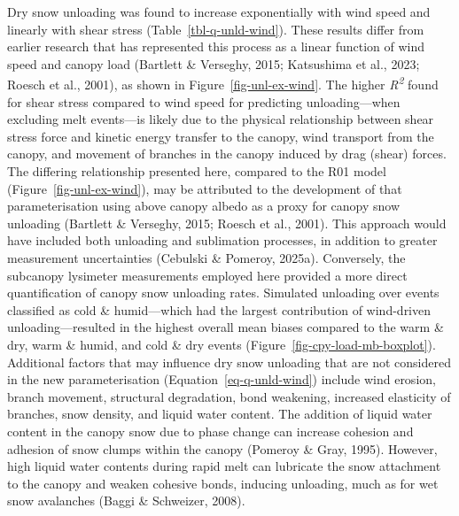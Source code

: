 \documentclass[
]{agujournal2019}
\begin{document}
Dry snow unloading was found to increase exponentially with wind speed
and linearly with shear stress (Table~\ref{tbl-q-unld-wind}). These
results differ from earlier research that has represented this process
as a linear function of wind speed and canopy load (Bartlett \&
Verseghy, 2015; Katsushima et al., 2023; Roesch et al., 2001), as shown
in Figure~\ref{fig-unl-ex-wind}. The higher \emph{R\textsuperscript{2}}
found for shear stress compared to wind speed for predicting
unloading---when excluding melt events---is likely due to the physical
relationship between shear stress force and kinetic energy transfer to
the canopy, wind transport from the canopy, and movement of branches in
the canopy induced by drag (shear) forces. The differing relationship
presented here, compared to the R01 model
(Figure~\ref{fig-unl-ex-wind}), may be attributed to the development of
that parameterisation using above canopy albedo as a proxy for canopy
snow unloading (Bartlett \& Verseghy, 2015; Roesch et al., 2001). This
approach would have included both unloading and sublimation processes,
in addition to greater measurement uncertainties (Cebulski \& Pomeroy,
2025a). Conversely, the subcanopy lysimeter measurements employed here
provided a more direct quantification of canopy snow unloading rates.
Simulated unloading over events classified as cold \& humid---which had
the largest contribution of wind-driven unloading---resulted in the
highest overall mean biases compared to the warm \& dry, warm \& humid,
and cold \& dry events (Figure~\ref{fig-cpy-load-mb-boxplot}).
Additional factors that may influence dry snow unloading that are not
considered in the new parameterisation (Equation~\ref{eq-q-unld-wind})
include wind erosion, branch movement, structural degradation, bond
weakening, increased elasticity of branches, snow density, and liquid
water content. The addition of liquid water content in the canopy snow
due to phase change can increase cohesion and adhesion of snow clumps
within the canopy (Pomeroy \& Gray, 1995). However, high liquid water
contents during rapid melt can lubricate the snow attachment to the
canopy and weaken cohesive bonds, inducing unloading, much as for wet
snow avalanches (Baggi \& Schweizer, 2008).
\end{document}
